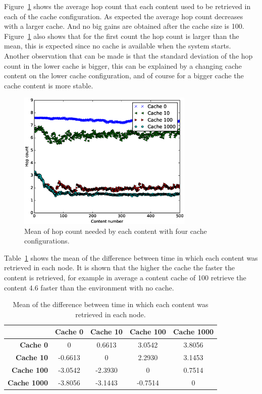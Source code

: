 \documentclass[10pt,a4paper,final]{IEEEtran}
\begin{document}
Figure~\ref{fig:hop} shows the average hop count that each content used to be
retrieved in each of the cache configuration.
As expected the average hop count decreases with a
larger cache. And no big gains are obtained after the cache size is 100.
Figure~\ref{fig:hop} also shows that for the first count the hop count is
larger than the mean, this is expected since no cache is available when the
system starts. Another observation that can be made is that the standard
deviation of the hop count in the lower cache is bigger, this can be explained
by a changing cache content on the lower cache configuration, and of course for
a bigger cache the cache content is more stable.

\begin{figure}
\centering
\includegraphics[height=2.6in]{hop}
\caption{Mean of hop count needed by each content with four cache
configurations.}\label{fig:hop}
\end{figure}

Table~\ref{tab:timediff} shows the mean of the difference between time in which
each content was retrieved in each node. It is shown that the higher the cache
the faster the content is retrieved, for example in average a content cache of
100 retrieve the content 4.6 faster than the environment with no cache.

\begin{table}[!t]
    \caption{Mean of the difference between time in which each content was
    retrieved in each node.}\label{tab:timediff}
    \centering
    \begin{tabular}{rcccc}
        \toprule
        & \bfseries Cache 0 & \bfseries Cache 10 & \bfseries Cache 100 &
            \bfseries Cache 1000 \\
        \midrule
        \bfseries Cache 0 & 0 & 0.6613 & 3.0542 & 3.8056 \\
        \bfseries Cache 10 & -0.6613 & 0 & 2.2930 & 3.1453 \\
        \bfseries Cache 100 & -3.0542 & -2.3930 & 0 & 0.7514 \\
        \bfseries Cache 1000 & -3.8056 & -3.1443 & -0.7514 & 0 \\
        \bottomrule
    \end{tabular}
\end{table}
\end{document}
